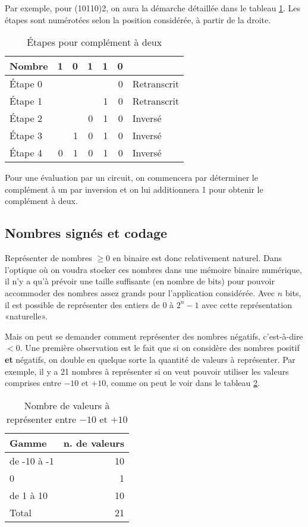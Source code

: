 \documentclass[11pt]{article}
\begin{document}
Par exemple, pour (10110)2, on aura la démarche détaillée dans le
tableau \ref{tab:org5f2e006}. Les étapes sont numérotées selon la position
considérée, à partir de la droite.

\begin{table}[htbp]
\caption{\label{tab:org5f2e006}Étapes pour complément à deux}
\centering
\begin{tabular}{lrrrrrl}
Nombre & 1 & 0 & 1 & 1 & 0 & \\
\hline
Étape 0 &  &  &  &  & 0 & Retranscrit\\
Étape 1 &  &  &  & 1 & 0 & Retranscrit\\
Étape 2 &  &  & 0 & 1 & 0 & Inversé\\
Étape 3 &  & 1 & 0 & 1 & 0 & Inversé\\
Étape 4 & 0 & 1 & 0 & 1 & 0 & Inversé\\
\end{tabular}
\end{table}

Pour une évaluation par un circuit, on commencera par déterminer le
complément à un par inversion et on lui additionnera 1 pour obtenir le
complément à deux.

\subsection{Nombres signés et codage}
\label{sec:org8d89d97}

Représenter de nombres \(\geq 0\) en binaire est donc relativement
naturel. Dans l'optique où on voudra stocker ces nombres dans une
mémoire binaire numérique, il n'y a qu'à prévoir une taille suffisante
(en nombre de bits) pour pouvoir accommoder des nombres assez grands
pour l'application considérée. Avec \(n\) bits, il est possible de
représenter des entiers de 0 à \(2^n-1\) avec cette représentation
«naturelle».

Mais on peut se demander comment représenter des nombres négatifs,
c'est-à-dire \(< 0\). Une première observation est le fait que si on
considère des nombres positif \textbf{et} négatifs, on double en quelque
sorte la quantité de valeurs à représenter. Par exemple, il y a 21
nombres à représenter si on veut pouvoir utiliser les valeurs
comprises entre \(-10\) et \(+10\), comme on peut le voir dans le
tableau \ref{tab:org95272cc}.

\begin{table}[htbp]
\caption{\label{tab:org95272cc}Nombre de valeurs à représenter entre \(-10\) et \(+10\)}
\centering
\begin{tabular}{lr}
Gamme & n. de valeurs\\
\hline
de -10 à -1 & 10\\
0 & 1\\
de 1 à 10 & 10\\
\hline
Total & 21\\
\end{tabular}
\end{table}
\end{document}
